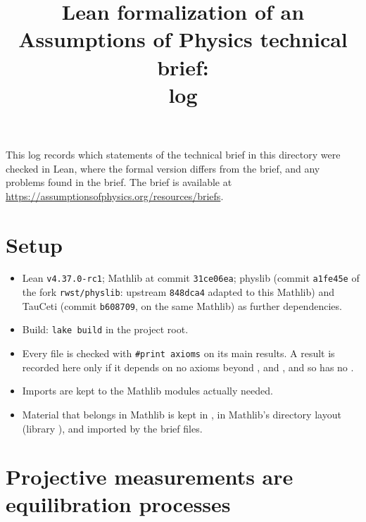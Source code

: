 \documentclass[11pt]{article}
\title{Lean formalization of an Assumptions of Physics technical brief:\\ log}
\author{}
\date{}
\begin{document}
\maketitle

\noindent
This log records which statements of the technical brief in this directory were checked in Lean,
where the formal version differs from the brief, and any problems found in the brief.
The brief is available at \url{https://assumptionsofphysics.org/resources/briefs}.

\section*{Setup}

\begin{itemize}
\item Lean \texttt{v4.37.0-rc1}; Mathlib at commit \texttt{31ce06ea}; physlib (commit \texttt{a1fe45e}
  of the fork \texttt{rwst/physlib}: upstream \texttt{848dca4} adapted to this Mathlib) and
  TauCeti (commit \texttt{b608709}, on the same Mathlib) as further dependencies.
\item Build: \texttt{lake build} in the project root.
\item Every file is checked with \texttt{\#print axioms} on its main results. A result is
  recorded here only if it depends on no axioms beyond ,
   and , and so has no .
\item Imports are kept to the Mathlib modules actually needed.
\item Material that belongs in Mathlib is kept in , in Mathlib's directory
  layout (library ), and imported by the brief files.
\end{itemize}



\section{Projective measurements are equilibration processes}
\end{document}
